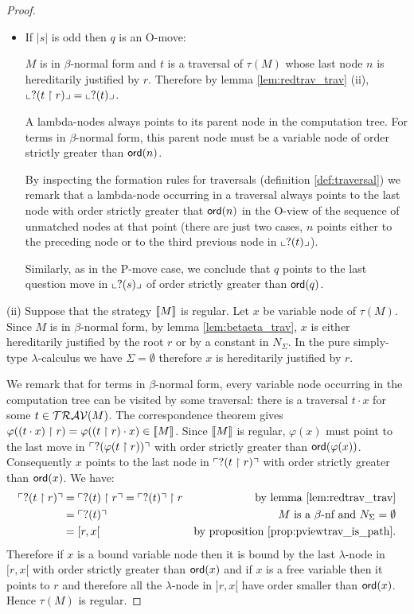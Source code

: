 \begin{proof}
\begin{itemize}
\item If $|s|$ is odd then $q$ is an O-move:

$M$ is in $\beta$-normal form and $t$ is a traversal of $\tau(M)$
whose last node $n$ is hereditarily justified by $r$. Therefore by lemma \ref{lem:redtrav_trav} (ii),
$ \llcorner ?(t \upharpoonright r) \lrcorner = \llcorner ?(t) \lrcorner$.

A lambda-nodes always points to its parent node in the computation
tree. For terms in $\beta$-normal form, this parent node must be a
variable node of order strictly greater than ${\sf ord}(n)$.

By inspecting the formation rules for traversals (definition
\ref{def:traversal}) we remark that a lambda-node occurring in a
traversal always points to the last node with order strictly greater
that ${\sf ord}(n)$ in the O-view of the sequence of unmatched nodes at
that point (there are just two cases, $n$ points either to the
preceding node or to the third previous node in $\llcorner ?(t) \lrcorner$).

Similarly, as in the P-move case, we conclude that $q$ points to the
last question move in $\llcorner ?(s) \lrcorner$ of order strictly greater than
${\sf ord}(q)$.
\end{itemize}

\noindent  %
(ii) Suppose that the strategy ${[\![ M ]\!]}$ is regular.
Let $x$ be variable node of $\tau(M)$.
Since $M$ is in $\beta$-normal form, by lemma \ref{lem:betaeta_trav},
$x$ is either hereditarily justified by the root $r$ or by a constant in $N_\Sigma$.
In the pure simply-type $\lambda$-calculus we have $\Sigma=\emptyset$ therefore $x$ is hereditarily justified by $r$.


We remark that for terms in $\beta$-normal form, every variable node occurring in the computation tree can be visited by some traversal:
there is a traversal $t \cdot x$ for some $t \in \mathcal{TRAV}(M)$.
The correspondence theorem gives $\varphi((t \cdot x) \upharpoonright r) = \varphi((t \upharpoonright r) \cdot x) \in {[\![M ]\!]}$.
Since ${[\![ M ]\!]}$ is regular, $\varphi(x)$ must point to the last move in $\ulcorner ?(\varphi(t \upharpoonright r)) \urcorner$ with
order strictly greater than ${\sf ord}(\varphi(x))$.
Consequently $x$ points to the last node in $\ulcorner ?(t \upharpoonright r) \urcorner$ with
order strictly greater than ${\sf ord}(x)$.
We have:
\begin{align*}
\ulcorner ?(t \upharpoonright r) \urcorner &= \ulcorner ?(t) \upharpoonright r \urcorner = \ulcorner ?(t) \urcorner \upharpoonright r & \mbox{by lemma \ref{lem:redtrav_trav}} \\
& = \ulcorner ?(t) \urcorner & \mbox{$M$ is a $\beta$-nf and $N_\Sigma = \emptyset$} \\
& = [r,x[ & \mbox{by proposition \ref{prop:pviewtrav_is_path}}.
\end{align*}
Therefore if $x$ is a bound variable node then it is bound by the last $\lambda$-node in $[r,x[$ with order strictly greater than ${\sf ord}(x)$
and if $x$ is a free variable then it points to $r$ and therefore all the $\lambda$-node in $]r,x[$ have order smaller than ${\sf ord}(x)$.
Hence $\tau(M)$ is regular.
\end{proof}

